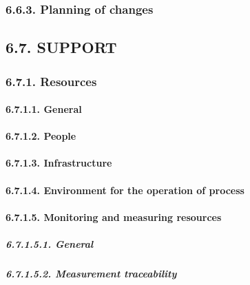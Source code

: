 \documentclass[
]{article}
\begin{document}
\hypertarget{planning-of-changes-1}{%
\subsubsection{6.6.3. Planning of changes}\label{planning-of-changes-1}}

\hypertarget{support-1}{%
\subsection{6.7. SUPPORT}\label{support-1}}

\hypertarget{resources-1}{%
\subsubsection{6.7.1. Resources}\label{resources-1}}

\hypertarget{general-10}{%
\paragraph{6.7.1.1. General}\label{general-10}}

\hypertarget{people-1}{%
\paragraph{6.7.1.2. People}\label{people-1}}

\hypertarget{infrastructure-1}{%
\paragraph{6.7.1.3. Infrastructure}\label{infrastructure-1}}

\hypertarget{environment-for-the-operation-of-process-1}{%
\paragraph{6.7.1.4. Environment for the operation of
process}\label{environment-for-the-operation-of-process-1}}

\hypertarget{monitoring-and-measuring-resources-1}{%
\paragraph{6.7.1.5. Monitoring and measuring
resources}\label{monitoring-and-measuring-resources-1}}

\hypertarget{general-11}{%
\subparagraph{6.7.1.5.1. General}\label{general-11}}

\hypertarget{measurement-traceability-1}{%
\subparagraph{6.7.1.5.2. Measurement
traceability}\label{measurement-traceability-1}}
\end{document}
